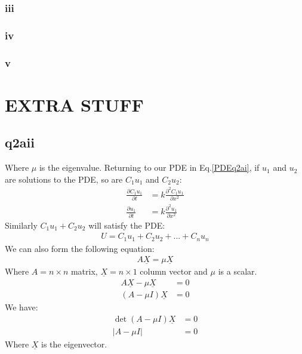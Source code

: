 \documentclass[11pt]{article}
\numberwithin{equation}{section}
\begin{document}
\subsubsection*{iii}
\subsubsection*{iv}
\subsubsection*{v}
\section{EXTRA STUFF}
\subsection{q2aii}
Where $\mu$ is the eigenvalue. Returning to our PDE in Eq.\ref{PDEq2ai}, if $u_1$ and $u_2$ are solutions to the PDE, so are $C_1 u_1$ and $C_2 u_2$:
\begin{align}
	\frac{\partial C_1 u_1}{\partial t} &= k\frac{\partial^2 C_1 u_1}{\partial x^2}\\
	\frac{\partial u_1}{\partial t} &= k\frac{\partial^2 u_1}{\partial x^2}
\end{align}
Similarly $C_1 u_1 + C_2 u_2$ will satisfy the PDE:
\begin{align}
	U = C_1 u_1 + C_2 u_2 + ... + C_n u_n
\end{align}
We can also form the following equation:
\begin{align}
	A\underline{X} = \mu \underline{X}
\end{align}
Where $A = n \times n$ matrix, $\underline{X} = n \times 1$ column vector and $\mu$ is a scalar. 
\begin{align}
	A \underline{X} - \mu \underline{X} &= 0\\
	\left( A - \mu I\right)\underline{X} &= 0
\end{align} 
We have:
\begin{align}
	\det \left(A - \mu I\right)\underline{X} &= 0\\
	\left| A - \mu I \right| &= 0
\end{align}
Where $\underline{X}$ is the eigenvector.
\end{document}
